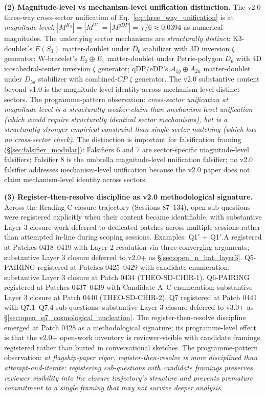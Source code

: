 \documentclass[11pt,letterpaper]{article}
\newcommand{\Kthree}{\ensuremath{K_3}}
\newcommand{\Dsix}{D_6}
\newcommand{\Sthree}{S_3}
\begin{document}
\textbf{(2) Magnitude-level vs mechanism-level unification distinction.} The v2.0 three-way cross-sector unification of Eq.~\eqref{eq:three_way_unification} is at \emph{magnitude level}: $|M^{\Kthree}| = |M^W| = |M^{qDP}| = \chi/6 \approx 0.0394$ as numerical magnitudes. The underlying sector mechanisms are \emph{structurally distinct}: K3-doublet's $E(\Sthree)$ matter-doublet under $\Dsix$ stabilizer with 3D inversion $\zeta$ generator; W-bracelet's $E_2 \oplus E_1$ matter-doublet under Petrie-polygon $\Dsix$ with 4D icosahedral-center inversion $\zeta$ generator; qDP/eDP's $A_{1g} \oplus A_{2u}$ matter-doublet under $D_{5d}$ stabilizer with combined-$CP$ $\zeta$ generator. The v2.0 substantive content beyond v1.0 is the magnitude-level identity across mechanism-level distinct sectors. The programme-pattern observation: \emph{cross-sector unification at magnitude level is a structurally weaker claim than mechanism-level unification (which would require structurally identical sector mechanisms), but is a structurally stronger empirical constraint than single-sector matching (which has no cross-sector check)}. The distinction is important for falsification framing (\S\ref{sec:falsifier_modular}): Falsifiers 6 and 7 are sector-specific magnitude-level falsifiers; Falsifier 8 is the umbrella magnitude-level unification falsifier; no v2.0 falsifier addresses mechanism-level unification because the v2.0 paper does not claim mechanism-level identity across sectors.

\textbf{(3) Register-then-resolve discipline as v2.0 methodological signature.} Across the Reading C closure trajectory (Sessions 87--134), open sub-questions were registered explicitly when their content became identifiable, with substantive Layer 3 closure work deferred to dedicated patches across multiple sessions rather than attempted in-line during scoping sessions. Examples: Q1$'$ + Q1$'$.A registered at Patches 0418--0419 with Layer 2 resolution via three converging arguments; substantive Layer 3 closure deferred to v2.0+ as \S\ref{sec:open_n_hat_layer3}. Q5-PAIRING registered at Patches 0425--0429 with candidate enumeration; substantive Layer 3 closure at Patch 0434 (THEO-SD-CHIR-1). Q6-PAIRING registered at Patches 0437--0439 with Candidate A--C enumeration; substantive Layer 3 closure at Patch 0440 (THEO-SD-CHIR-2). Q7 registered at Patch 0441 with Q7.1--Q7.4 sub-questions; substantive Layer 3 closure deferred to v3.0+ as \S\ref{sec:open_q7_cosmological_nucleation}. The register-then-resolve discipline emerged at Patch 0428 as a methodological signature; its programme-level effect is that the v2.0+ open-work inventory is reviewer-visible with candidate framings registered rather than buried in conversational sketches. The programme-pattern observation: \emph{at flagship-paper rigor, register-then-resolve is more disciplined than attempt-and-iterate: registering sub-questions with candidate framings preserves reviewer visibility into the closure trajectory's structure and prevents premature commitment to a single framing that may not survive deeper analysis}.
\end{document}
